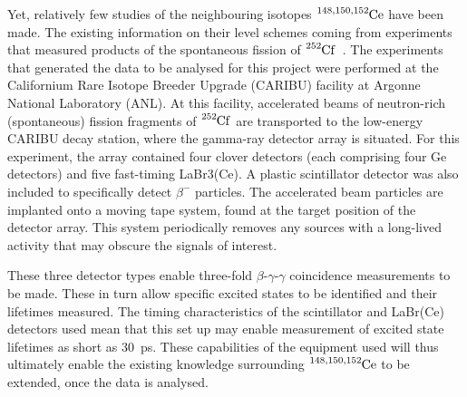 \documentclass[12pt,a4paper]{article}
\begin{document}
\medskip
\noindent
Yet, relatively few studies of the neighbouring isotopes $\ce{^{148,150,152}Ce}$ have been made. The existing information on their level schemes coming from experiments that measured products of the spontaneous fission of $\ce{^{252}Cf}$~\cite{nica_notitle_117,
martin_notitle_114,
bazu_notitle_114}.
The experiments that generated the data to be analysed for this project were performed at the Californium Rare Isotope Breeder Upgrade (CARIBU) facility at Argonne National Laboratory (ANL).
At this facility, accelerated beams of neutron-rich (spontaneous) fission fragments of $\ce{^{252}Cf}$ are transported to the low-energy CARIBU decay station, where the gamma-ray detector array is situated.
For this experiment, the array contained four clover detectors (each comprising four Ge detectors) and five fast-timing LaBr3(Ce).
A plastic scintillator detector was also included to specifically detect $\beta^-$ particles.
The accelerated beam particles are implanted onto a moving tape system, found at the target position of the detector array.
This system periodically removes any sources with a long-lived activity that may obscure the signals of interest.

\medskip
\noindent
These three detector types enable three-fold $\beta$-$\gamma$-$\gamma$ coincidence measurements to be made.
These in turn allow specific excited states to be identified and their lifetimes measured.
The timing characteristics of the scintillator and LaBr(Ce) detectors used mean that this set up may enable measurement of excited state lifetimes as short as 30~ps.
These capabilities of the equipment used will thus ultimately enable the existing knowledge surrounding $\ce{^{148,150,152}Ce}$ to be extended, once the data is analysed.
\end{document}
